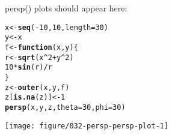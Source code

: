 \documentclass{article}\usepackage[]{graphicx}\usepackage[]{color}
\makeatletter
\def\maxwidth{ %
  \ifdim\Gin@nat@width>\linewidth
    \linewidth
  \else
    \Gin@nat@width
  \fi
}
\newcommand{\hlnum}[1]{\textcolor[rgb]{0.686,0.059,0.569}{#1}}%
\newcommand{\hlopt}[1]{\textcolor[rgb]{0,0,0}{#1}}%
\newcommand{\hlstd}[1]{\textcolor[rgb]{0.345,0.345,0.345}{#1}}%
\newcommand{\hlkwa}[1]{\textcolor[rgb]{0.161,0.373,0.58}{\textbf{#1}}}%
\newcommand{\hlkwb}[1]{\textcolor[rgb]{0.69,0.353,0.396}{#1}}%
\newcommand{\hlkwc}[1]{\textcolor[rgb]{0.333,0.667,0.333}{#1}}%
\newcommand{\hlkwd}[1]{\textcolor[rgb]{0.737,0.353,0.396}{\textbf{#1}}}%
\newenvironment{kframe}{%
 \def\at@end@of@kframe{}%
 \ifinner\ifhmode%
  \def\at@end@of@kframe{\end{minipage}}%
  \begin{minipage}{\columnwidth}%
 \fi\fi%
 \def\FrameCommand##1{\hskip\@totalleftmargin \hskip-\fboxsep
 \colorbox{shadecolor}{##1}\hskip-\fboxsep
     \hskip-\linewidth \hskip-\@totalleftmargin \hskip\columnwidth}%
 \MakeFramed {\advance\hsize-\width
   \@totalleftmargin\z@ \linewidth\hsize
   \@setminipage}}%
 {\par\unskip\endMakeFramed%
 \at@end@of@kframe}
\newenvironment{knitrout}{}{} %
\makeatother
\begin{document}
persp() plots should appear here:

\begin{knitrout}
\color{fgcolor}\begin{kframe}
\begin{alltt}
\hlstd{x} \hlkwb{<-} \hlkwd{seq}\hlstd{(}\hlopt{-}\hlnum{10}\hlstd{,} \hlnum{10}\hlstd{,} \hlkwc{length} \hlstd{=} \hlnum{30}\hlstd{)}
\hlstd{y} \hlkwb{<-} \hlstd{x}
\hlstd{f} \hlkwb{<-} \hlkwa{function}\hlstd{(}\hlkwc{x}\hlstd{,} \hlkwc{y}\hlstd{) \{}
    \hlstd{r} \hlkwb{<-} \hlkwd{sqrt}\hlstd{(x}\hlopt{^}\hlnum{2} \hlopt{+} \hlstd{y}\hlopt{^}\hlnum{2}\hlstd{)}
    \hlnum{10} \hlopt{*} \hlkwd{sin}\hlstd{(r)}\hlopt{/}\hlstd{r}
\hlstd{\}}
\hlstd{z} \hlkwb{<-} \hlkwd{outer}\hlstd{(x, y, f)}
\hlstd{z[}\hlkwd{is.na}\hlstd{(z)]} \hlkwb{<-} \hlnum{1}
\hlkwd{persp}\hlstd{(x, y, z,} \hlkwc{theta} \hlstd{=} \hlnum{30}\hlstd{,} \hlkwc{phi} \hlstd{=} \hlnum{30}\hlstd{)}
\end{alltt}
\end{kframe}
\texttt{[image: figure/032-persp-persp-plot-1]} 

\end{knitrout}
\end{document}
